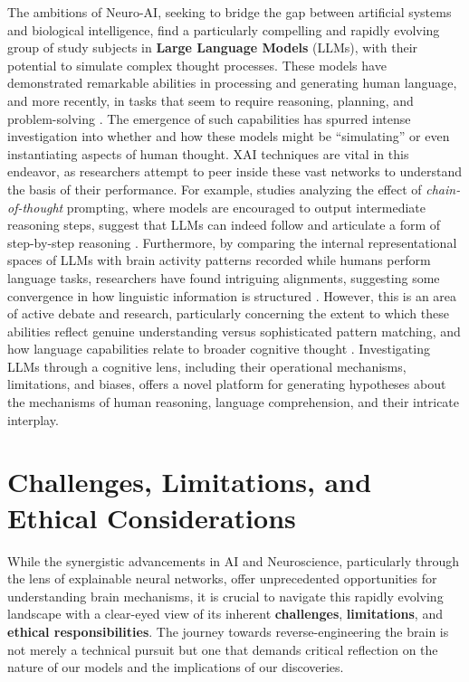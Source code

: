 The ambitions of Neuro-AI, seeking to bridge the gap between artificial systems and biological intelligence, find a particularly compelling and rapidly evolving group of study subjects in \textbf{Large Language Models} (LLMs), with their potential to simulate complex thought processes. These models have demonstrated remarkable abilities in processing and generating human language, and more recently, in tasks that seem to require reasoning, planning, and problem-solving \cite{wei2022chain}. The emergence of such capabilities has spurred intense investigation into whether and how these models might be ``simulating'' or even instantiating aspects of human thought. XAI techniques are vital in this endeavor, as researchers attempt to peer inside these vast networks to understand the basis of their performance. For example, studies analyzing the effect of \textit{chain-of-thought} prompting, where models are encouraged to output intermediate reasoning steps, suggest that LLMs can indeed follow and articulate a form of step-by-step reasoning \cite{wei2022chain}. Furthermore, by comparing the internal representational spaces of LLMs with brain activity patterns recorded while humans perform language tasks, researchers have found intriguing alignments, suggesting some convergence in how linguistic information is structured \cite{caucheteux2022brains, toneva2019interpreting}. However, this is an area of active debate and research, particularly concerning the extent to which these abilities reflect genuine understanding versus sophisticated pattern matching, and how language capabilities relate to broader cognitive thought \cite{mahowald2023dissociating, binz2023using}. Investigating LLMs through a cognitive lens, including their operational mechanisms, limitations, and biases, offers a novel platform for generating hypotheses about the mechanisms of human reasoning, language comprehension, and their intricate interplay.

\section{Challenges, Limitations, and Ethical Considerations}

While the synergistic advancements in AI and Neuroscience, particularly through the lens of explainable neural networks, offer unprecedented opportunities for understanding brain mechanisms, it is crucial to navigate this rapidly evolving landscape with a clear-eyed view of its inherent \textbf{challenges}, \textbf{limitations}, and \textbf{ethical responsibilities}. The journey towards reverse-engineering the brain is not merely a technical pursuit but one that demands critical reflection on the nature of our models and the implications of our discoveries.

